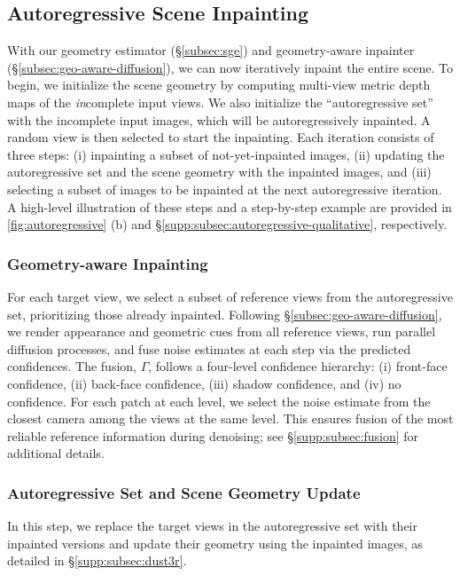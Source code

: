\subsection{Autoregressive Scene Inpainting}
\label{subsec:autoregressive}

With our geometry estimator (\S\ref{subsec:sge}) and geometry-aware inpainter (\S\ref{subsec:geo-aware-diffusion}), we can now iteratively inpaint the entire scene.
To begin, we initialize the scene geometry by computing multi-view metric depth maps of the \textit{in}complete input views. 
We also initialize the ``autoregressive set'' with the incomplete input images, which will be autoregressively inpainted. 
A random view is then selected to start the inpainting. 
Each iteration consists of three steps: 
(i) 
inpainting
a subset of not-yet-inpainted images,
(ii) updating the autoregressive set and the scene geometry with the inpainted images, and 
(iii) selecting a subset of images
to be inpainted
at
the next autoregressive iteration. A high-level illustration of these steps and a step-by-step example are provided in \cref{fig:autoregressive} (b) and \S\ref{supp:subsec:autoregressive-qualitative}, respectively.

\subsubsection{Geometry-aware Inpainting}
\label{subsubsec:geo-aware-inpainting}
For each target view, we select a subset of reference views from the autoregressive set,
prioritizing those already inpainted.
Following \S\ref{subsec:geo-aware-diffusion}, we render appearance and geometric cues from all reference views, run parallel diffusion processes,
and fuse noise estimates at each step via the predicted confidences. 
The fusion, $\Gamma$, follows a four-level confidence hierarchy: (i) front-face confidence, (ii) back-face confidence, (iii) shadow confidence, and (iv) no confidence. For each patch at each level, we select the noise estimate from the closest camera among the views at the same level. This 
ensures
fusion of
the most reliable
reference information
during
denoising;
see \S\ref{supp:subsec:fusion} for additional details.

\subsubsection{Autoregressive Set and Scene Geometry Update}

In this step, we replace the target views in the autoregressive set with their inpainted versions and update their geometry
using the
inpainted images, as detailed in \S\ref{supp:subsec:dust3r}.

